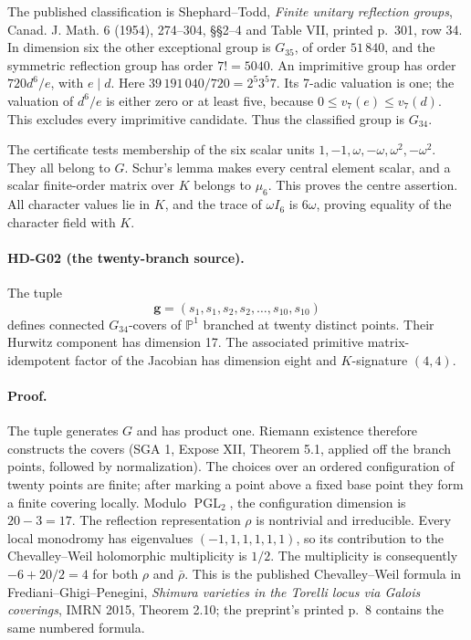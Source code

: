 The published classification is Shephard--Todd, \emph{Finite unitary
reflection groups}, Canad. J. Math. 6 (1954), 274--304, \S\S2--4 and
Table VII, printed p.~301, row 34. In dimension six the other exceptional
group is $G_{35}$, of order $51\,840$, and the symmetric reflection group
has order $7!=5040$. An imprimitive group has order $720d^6/e$, with
$e\mid d$. Here $39\,191\,040/720=2^5 3^5 7$. Its 7-adic valuation is
one; the valuation of $d^6/e$ is either zero or at least five, because
$0\le v_7(e)\le v_7(d)$. This excludes every imprimitive candidate.
Thus the classified group is $G_{34}$.

The certificate tests membership of the six scalar units
$1,-1,\omega,-\omega,\omega^2,-\omega^2$. They all belong to $G$.
Schur's lemma makes every central element scalar, and a scalar finite-order
matrix over $K$ belongs to $\mu_6$. This proves the centre assertion.
All character values lie in $K$, and the trace of $\omega I_6$ is
$6\omega$, proving equality of the character field with $K$.

\paragraph{HD-G02 (the twenty-branch source).}
The tuple
\[
\boldsymbol g=(s_1,s_1,s_2,s_2,\ldots,s_{10},s_{10})
\]
defines connected $G_{34}$-covers of $\mathbb P^1$ branched at twenty
distinct points. Their Hurwitz component has dimension 17. The associated
primitive matrix-idempotent factor of the Jacobian has dimension eight
and $K$-signature $(4,4)$.

\paragraph{Proof.}
The tuple generates $G$ and has product one. Riemann existence therefore
constructs the covers (SGA 1, Expose XII, Theorem 5.1, applied off the
branch points, followed by normalization). The choices over an ordered configuration of twenty
points are finite; after marking a point above a fixed base point they
form a finite covering locally. Modulo $\operatorname{PGL}_2$, the
configuration dimension is $20-3=17$.
The reflection representation $\rho$ is nontrivial and irreducible.
Every local monodromy has eigenvalues $(-1,1,1,1,1,1)$, so its contribution
to the Chevalley--Weil holomorphic multiplicity is $1/2$.
The multiplicity is consequently $-6+20/2=4$ for both $\rho$ and
$\bar\rho$. This is the published Chevalley--Weil formula in
Frediani--Ghigi--Penegini, \emph{Shimura varieties in the Torelli locus via
Galois coverings}, IMRN 2015, Theorem 2.10; the preprint's printed p.~8
contains the same numbered formula.

